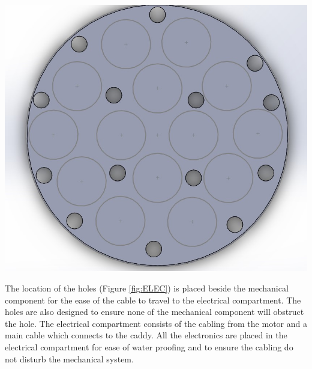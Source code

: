 \documentclass[11pt,landscape]{article}
\newenvironment{Figure}
  {\par\medskip\noindent\minipage{\linewidth}}
  {\endminipage\par\medskip}
\begin{document}
\begin{multicols}{3}
    \begin{Figure}
        \begin{center}
            \includegraphics[width=\textwidth]{Figure9.jpg}
            \label{fig:ELEC}
        \end{center}
    \end{Figure}

    The location of the holes (Figure \ref{fig:ELEC}) is placed beside the
    mechanical component for the ease of the cable to travel to the electrical
    compartment. The holes are also designed to ensure none of the mechanical
    component will obstruct the hole. The electrical compartment consists of the
    cabling from the motor and a main cable which connects to the caddy. All the
    electronics are placed in the electrical compartment for ease of water
    proofing and to ensure the cabling do not disturb the mechanical system. 
    

\end{multicols}
\end{document}
